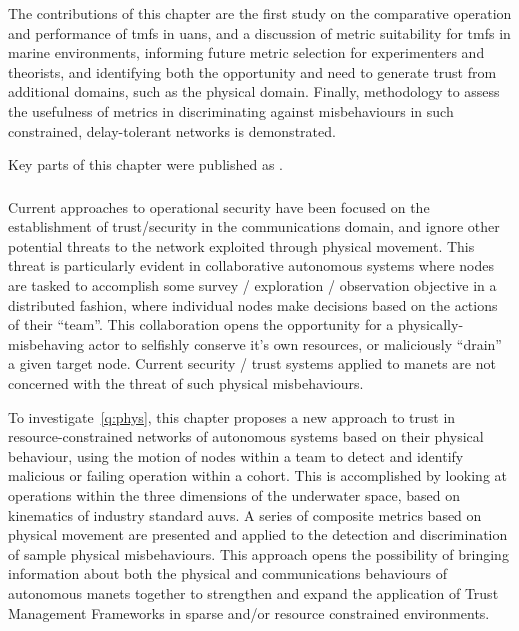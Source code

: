 The contributions of this chapter are the first study on the comparative operation and performance of \glspl{tmf} in \glspl{uan}, and a discussion of metric suitability for \glspl{tmf} in marine environments, informing future metric selection for experimenters and theorists, and identifying both the opportunity and need to generate trust from additional domains, such as the physical domain.
Finally, methodology to assess the usefulness of metrics in discriminating against misbehaviours in such constrained, delay-tolerant networks is demonstrated.

Key parts of this chapter were published as .

\subsubsection{}

Current approaches to operational security have been focused on the establishment of trust/security in the communications domain, and ignore other potential threats to the network exploited through physical movement.
This threat is particularly evident in collaborative autonomous systems where nodes are tasked to accomplish some survey / exploration / observation objective in a distributed fashion, where individual nodes make decisions based on the actions of their ``team''. 
This collaboration opens the opportunity for a physically-misbehaving actor to selfishly conserve it's own resources, or maliciously ``drain'' a given target node.
Current security / trust systems applied to \glspl{manet} are not concerned with the threat of such physical misbehaviours.

To investigate~\ref{q:phys}, this chapter proposes a new approach to trust in resource-constrained networks of autonomous systems based on their physical behaviour, using the motion of nodes within a team to detect and identify malicious or failing operation within a cohort.
This is accomplished by looking at operations within the three dimensions of the underwater space, based on kinematics of industry standard \glspl{auv}.
A series of composite metrics based on physical movement are presented and applied to the detection and discrimination of sample physical misbehaviours.
This approach opens the possibility of bringing information about both the physical and communications behaviours of autonomous \glspl{manet} together to strengthen and expand the application of Trust Management Frameworks in sparse and/or resource constrained environments.


